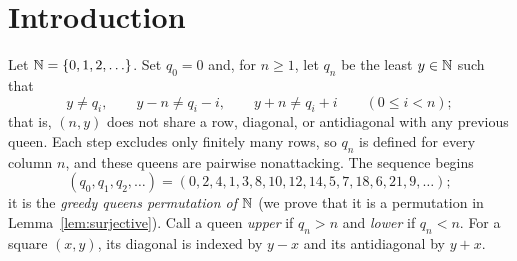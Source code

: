 \section{Introduction}
Let $\mathbb N=\{0,1,2,\ldots\}$. Set $q_0=0$ and, for
$n\ge1$, let $q_n$ be the least $y\in\mathbb N$ such that
\begin{equation}\label{eq:greedy}
 y\ne q_i,\qquad y-n\ne q_i-i,\qquad y+n\ne q_i+i
 \qquad(0\le i<n);
\end{equation}
that is, $(n,y)$ does not share a row, diagonal, or antidiagonal
with any previous queen.
Each step excludes only finitely many rows, so $q_n$ is defined
for every column $n$, and these queens are pairwise nonattacking. The sequence begins
\[
 (q_0,q_1,q_2,\dots)=(0,2,4,1,3,8,10,12,14,5,7,18,6,21,9,\dots);
\]
it is the \emph{greedy queens permutation of $\mathbb N$} (we prove that it is a permutation in Lemma~\ref{lem:surjective}).
Call a queen \textcolor{queensUpper}{\emph{upper}} if $q_n>n$ and
\textcolor{queensLower}{\emph{lower}} if $q_n<n$.
For a square $(x,y)$, its diagonal is indexed by $y-x$ and its antidiagonal by $y+x$.

